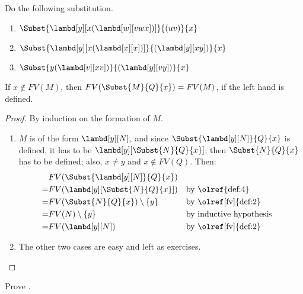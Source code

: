 \documentclass[../../../include/open-logic-section]{subfiles}
\begin{document}
\begin{prob}
  Do the following substitution.
  \begin{enumerate}
  \item $\Subst{\lambd[y][x(\lambd[w][vwx])]}{(uv)}{x}$
  \item $\Subst{\lambd[y][x(\lambd[x][x])]}{(\lambd[y][xy])}{x}$
  \item $\Subst{y(\lambd[v][xv])}{(\lambd[y][vy])}{x}$
  \end{enumerate}
\end{prob}

\begin{thm} 
  If $x \notin FV(M)$, then $FV(\Subst{M}{Q}{x}) = FV(M)$, if
  the left hand is defined.
\end{thm}
\begin{proof}
  By induction on the formation of $M$.
  \begin{enumerate}
    \item $M$ is of the form $\lambd[y][N]$, and
      since $\Subst{\lambd[y][N]}{Q}{x}$ is defined, it has to be
      $\lambd[y][\Subst{N}{Q}{x}]$; then $\Subst{N}{Q}{x}$ has
      to be defined; also, $x \neq y$ and $x \notin FV(Q)$. Then:
      \begin{align*}
        &FV(\Subst{\lambd[y][N]}{Q}{x}) \\
        =&FV(\lambd[y][\Subst{N}{Q}{x}]) && \text{by \olref{def:4}}\\
        =&FV(\Subst{N}{Q}{x}) \setminus \{y\} && \text{by
                                                     \olref[fv]{def:2}}
        \\
        =&FV(N) \setminus \{y\} && \text{by inductive hypothesis} \\
        =&FV(\lambd[y][N]) && \text{by \olref[fv]{def:2}}
      \end{align*}
    \item The other two cases are easy and left as exercises. 
  \end{enumerate}
\end{proof}

\begin{prob}
  Prove .
\end{prob}
\end{document}
